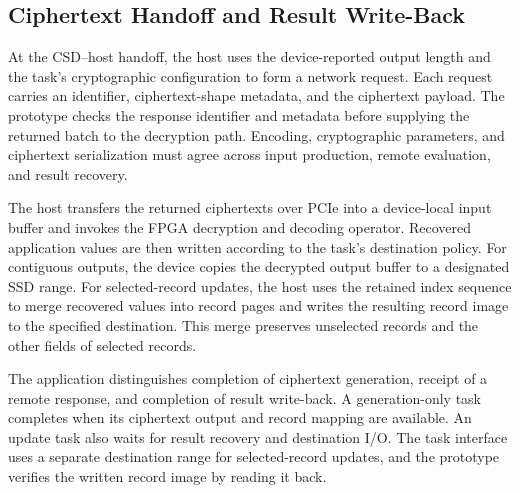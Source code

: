 \subsection{Ciphertext Handoff and Result Write-Back}
\label{subsec:ciphertext-handoff}

At the CSD--host handoff, the host uses the device-reported output length and the task's cryptographic configuration to form a network request. Each request carries an identifier, ciphertext-shape metadata, and the ciphertext payload. The prototype checks the response identifier and metadata before supplying the returned batch to the decryption path. Encoding, cryptographic parameters, and ciphertext serialization must agree across input production, remote evaluation, and result recovery.

The host transfers the returned ciphertexts over PCIe into a device-local input buffer and invokes the FPGA decryption and decoding operator. Recovered application values are then written according to the task's destination policy. For contiguous outputs, the device copies the decrypted output buffer to a designated SSD range. For selected-record updates, the host uses the retained index sequence to merge recovered values into record pages and writes the resulting record image to the specified destination. This merge preserves unselected records and the other fields of selected records.

The application distinguishes completion of ciphertext generation, receipt of a remote response, and completion of result write-back. A generation-only task completes when its ciphertext output and record mapping are available. An update task also waits for result recovery and destination I/O. The task interface uses a separate destination range for selected-record updates, and the prototype verifies the written record image by reading it back.
